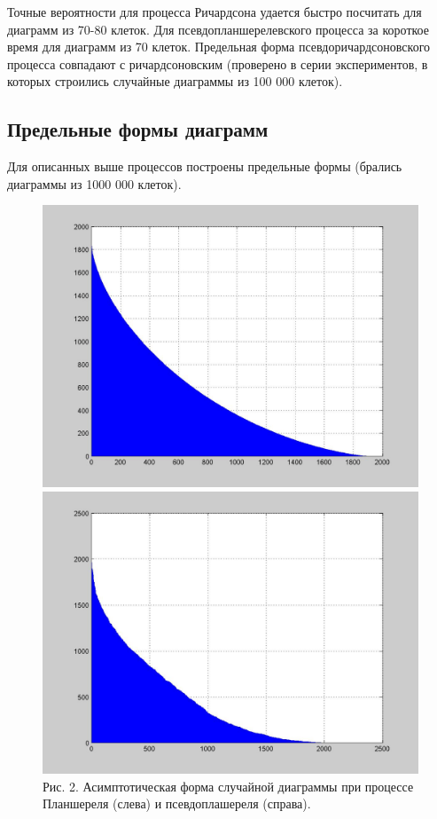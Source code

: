\documentclass[12pt]{report}
\begin{document}
Точные вероятности для процесса Ричардсона удается быстро посчитать для диаграмм из 70-80 клеток. Для псевдопланшерелевского процесса за короткое время для диаграмм из 70 клеток. Предельная форма псевдоричардсоновского процесса совпадают с ричардсоновским (проверено в серии экспериментов, в которых строились случайные диаграммы из 100 000 клеток).

\subsection*{Предельные формы диаграмм}

\hspace{\parindent} Для описанных выше процессов построены предельные формы (брались диаграммы из 1000 000 клеток). 

\begin{figure}[!ht]
\begin{center}
\includegraphics[scale=0.2]{Plansherel_assympt}
\includegraphics[scale=0.2]{ALPHA_assympt}
\\Рис. 2. Асимптотическая форма случайной диаграммы при процессе Планшереля (слева) и псевдоплашереля (справа).
\end{center}
\end{figure}
\end{document}
